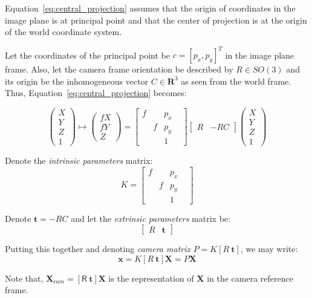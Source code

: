 \documentclass[MSc,beforeExam]{iitcsthesis}
\begin{document}
Equation~\ref{eq:central_projection} assumes that the origin of coordinates in
the image plane is at principal point and that the center of
projection is at the origin of the world coordinate system.

Let the coordinates of the principal point be $c = [p_x,p_y]^T$ in the
image plane frame. Also, let the camera frame orientation be described
by $R\in SO(3)$ and its origin be the inhomogeneous vector
$C\in \mathbf{R}^3$ as seen from the world frame. Thus,
Equation~\ref{eq:central_projection} becomes:

\begin{equation}\label{eq:central_projection1}
\begin{pmatrix}
X\\ Y\\ Z\\ 1
\end{pmatrix}
\mapsto
\begin{pmatrix}
fX\\ fY\\ Z
\end{pmatrix}
=
\begin{bmatrix}
f& &p_x& \\
 &f&p_y& \\
 & &1  &
\end{bmatrix}
\begin{bmatrix}
R & -RC
\end{bmatrix}
\begin{pmatrix}
X\\ Y\\ Z\\ 1
\end{pmatrix}
\end{equation}

Denote the \emph{intrinsic parameters} matrix:
\begin{equation}
K=\begin{bmatrix}
f& &p_x& \\
 &f&p_y& \\
 & &1  &
\end{bmatrix}
\end{equation}

Denote $\mathbf{t} = -RC$ and let the \emph{extrinsic parameters}
matrix be:
\begin{equation}
\begin{bmatrix}
R & \mathbf{t}
\end{bmatrix}
\end{equation}

Putting this together and denoting \emph{camera matrix}
$P=K[R\ \mathbf{t}]$, we may write:
\begin{equation}
\mathbf{x} = K[R\ \mathbf{t}]\mathbf{X} = P\mathbf{X}
\end{equation}

Note that, $ \mathbf{X}_{cam}= [\mathsf{R}\ \mathbf{t}]\mathbf{X}$ is the
representation of $\mathbf{X}$ in the camera reference frame.

{}



\end{document}

